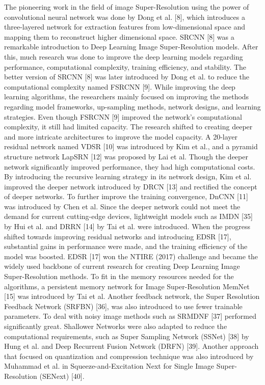 \documentclass[twocolumn]{svjour3}          %
\begin{document}
The pioneering work in the field of image Super-Resolution using the power of convolutional neural network was done by Dong et al. [8], which introduces a three-layered network for extraction features from low-dimensional space and mapping them to reconstruct higher dimensional space. SRCNN [8] was a remarkable introduction to Deep Learning Image Super-Resolution models. After this, much research was done to improve the deep learning models regarding performance, computational complexity, training efficiency, and stability. The better version of SRCNN [8] was later introduced by Dong et al. to reduce the computational complexity named FSRCNN [9]. While improving the deep learning algorithms, the researchers mainly focused on improving the methods regarding model frameworks, up-sampling methods, network designs, and learning strategies. Even though FSRCNN [9] improved the network's computational complexity, it still had limited capacity. The research shifted to creating deeper and more intricate architectures to improve the model capacity. A 20-layer residual network named VDSR [10] was introduced by Kim et al., and a pyramid structure network LapSRN [12] was proposed by Lai et al. Though the deeper network significantly improved performance, they had high computational costs. By introducing the recursive learning strategy in its network design, Kim et al. improved the deeper network introduced by DRCN [13] and rectified the concept of deeper networks. To further improve the training convergence, DnCNN [11] was introduced by Chen et al. Since the deeper network could not meet the demand for current cutting-edge devices, lightweight models such as IMDN [35] by Hui et al. and DRRN [14] by Tai et al. were introduced. When the progress shifted towards improving residual networks and introducing EDSR [17], substantial gains in performance were made, and the training efficiency of the model was boosted. EDSR [17] won the NTIRE (2017) challenge and became the widely used backbone of current research for creating Deep Learning Image Super-Resolution methods. To fit in the memory resources needed for the algorithms, a persistent memory network for Image Super-Resolution MemNet [15] was introduced by Tai et al. Another feedback network, the Super Resolution Feedback Network (SRFBN) [36], was also introduced to use fewer trainable parameters. To deal with noisy image methods such as SRMDNF [37] performed significantly great. Shallower Networks were also adapted to reduce the computational requirements, such as Super Sampling Network (SSNet) [38] by Hung et al. and Deep Recurrent Fusion Network (DRFN) [39]. Another approach that focused on quantization and compression technique was also introduced by Muhammad et al. in Squeeze-and-Excitation Next for Single Image Super-Resolution (SENext) [40].
\end{document}
